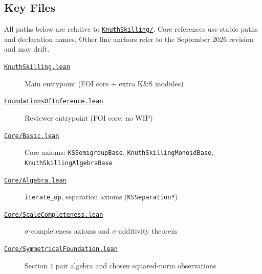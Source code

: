 \documentclass[11pt]{article}
\theoremstyle{definition}
\theoremstyle{remark}
\begin{document}
\subsection{Key Files}

All paths below are relative to \href{https://github.com/zariuq/ks-foundations-of-inference/tree/main/KnuthSkilling/}{\texttt{KnuthSkilling/}}.
Core references use stable paths and declaration names. Other line anchors refer
to the September 2026 revision and may drift.

\begin{description}
\item[\href{https://github.com/zariuq/ks-foundations-of-inference/blob/main/KnuthSkilling.lean}{\texttt{KnuthSkilling.lean}}] Main entrypoint (FOI core + extra K\&S modules)
\item[\href{https://github.com/zariuq/ks-foundations-of-inference/blob/main/KnuthSkilling/FoundationsOfInference.lean}{\texttt{FoundationsOfInference.lean}}] Reviewer entrypoint (FOI core; no WIP)

\medskip
\item[\href{https://github.com/zariuq/ks-foundations-of-inference/blob/main/KnuthSkilling/Core/Basic.lean}{\texttt{Core/Basic.lean}}] Core axioms: \texttt{KSSemigroupBase}, \texttt{KnuthSkillingMonoidBase},\\
      \texttt{KnuthSkillingAlgebraBase}
\item[\href{https://github.com/zariuq/ks-foundations-of-inference/blob/main/KnuthSkilling/Core/Algebra.lean}{\texttt{Core/Algebra.lean}}] \texttt{iterate\_op}, separation axioms (\texttt{KSSeparation*})
\item[\href{https://github.com/zariuq/ks-foundations-of-inference/blob/main/KnuthSkilling/Core/ScaleCompleteness.lean}{\texttt{Core/ScaleCompleteness.lean}}] $\sigma$-completeness axioms and $\sigma$-additivity theorem
\item[\href{https://github.com/zariuq/ks-foundations-of-inference/blob/main/KnuthSkilling/Core/SymmetricalFoundation.lean}{\texttt{Core/SymmetricalFoundation.lean}}] Section 4 pair algebra and chosen squared-norm observations


\end{description}
\end{document}
